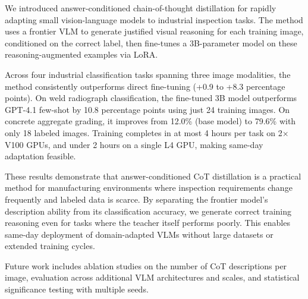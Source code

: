 \documentclass{bmvc2k}
\begin{document}
We introduced answer-conditioned chain-of-thought distillation for rapidly adapting small vision-language models to industrial inspection tasks. The method uses a frontier VLM to generate justified visual reasoning for each training image, conditioned on the correct label, then fine-tunes a 3B-parameter model on these reasoning-augmented examples via LoRA.

Across four industrial classification tasks spanning three image modalities, the method consistently outperforms direct fine-tuning (+0.9 to +8.3 percentage points). On weld radiograph classification, the fine-tuned 3B model outperforms GPT-4.1 few-shot by 10.8 percentage points using just 24 training images. On concrete aggregate grading, it improves from 12.0\% (base model) to 79.6\% with only 18 labeled images. Training completes in at most 4 hours per task on 2$\times$V100 GPUs, and under 2 hours on a single L4 GPU, making same-day adaptation feasible.

These results demonstrate that answer-conditioned CoT distillation is a practical method for manufacturing environments where inspection requirements change frequently and labeled data is scarce. By separating the frontier model's description ability from its classification accuracy, we generate correct training reasoning even for tasks where the teacher itself performs poorly. This enables same-day deployment of domain-adapted VLMs without large datasets or extended training cycles.

Future work includes ablation studies on the number of CoT descriptions per image, evaluation across additional VLM architectures and scales, and statistical significance testing with multiple seeds.


\end{document}
